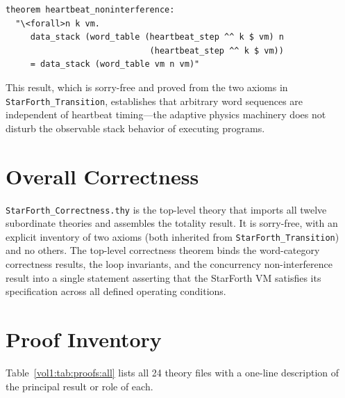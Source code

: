 \begin{lstlisting}[language=isabelle]
theorem heartbeat_noninterference:
  "\<forall>n k vm.
     data_stack (word_table (heartbeat_step ^^ k $ vm) n
                             (heartbeat_step ^^ k $ vm))
     = data_stack (word_table vm n vm)"
\end{lstlisting}

This result, which is sorry-free and proved from the two axioms in
\texttt{StarForth\_Transition}, establishes that arbitrary word sequences are
independent of heartbeat timing---the adaptive physics machinery does not
disturb the observable stack behavior of executing programs.

\section{Overall Correctness}
\label{vol1:sec:proofs:correctness}


\texttt{StarForth\_Correctness.thy} is the top-level theory that imports all
twelve subordinate theories and assembles the totality result. It is
sorry-free, with an explicit inventory of two axioms (both inherited from
\texttt{StarForth\_Transition}) and no others. The top-level correctness
theorem binds the word-category correctness results, the loop invariants, and
the concurrency non-interference result into a single statement asserting that
the StarForth VM satisfies its specification across all defined operating
conditions.

\section{Proof Inventory}
\label{vol1:sec:proofs:inventory}

Table~\ref{vol1:tab:proofs:all} lists all 24 theory files with a one-line
description of the principal result or role of each.

